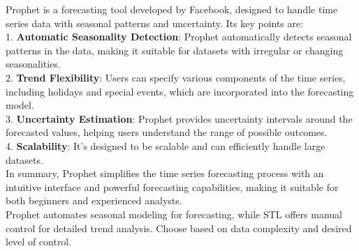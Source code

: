 Prophet\cite{example} is a forecasting tool developed by Facebook, designed to handle time series data with seasonal patterns and uncertainty. Its key points are: \\
1. \textbf{Automatic Seasonality Detection}: Prophet automatically detects seasonal patterns in the data, making it suitable for datasets with irregular or changing seasonalities. \\
2. \textbf{Trend Flexibility}: Users can specify various components of the time series, including holidays and special events, which are incorporated into the forecasting model. \\
3. \textbf{Uncertainty Estimation}: Prophet provides uncertainty intervals around the forecasted values, helping users understand the range of possible outcomes. \\
4. \textbf{Scalability}: It's designed to be scalable and can efficiently handle large datasets. \\
In summary, Prophet simplifies the time series forecasting process with an intuitive interface and powerful forecasting capabilities, making it suitable for both beginners and experienced analysts. \\

Prophet automates seasonal modeling for forecasting, while STL offers manual control for detailed trend analysis. Choose based on data complexity and desired level of control.

